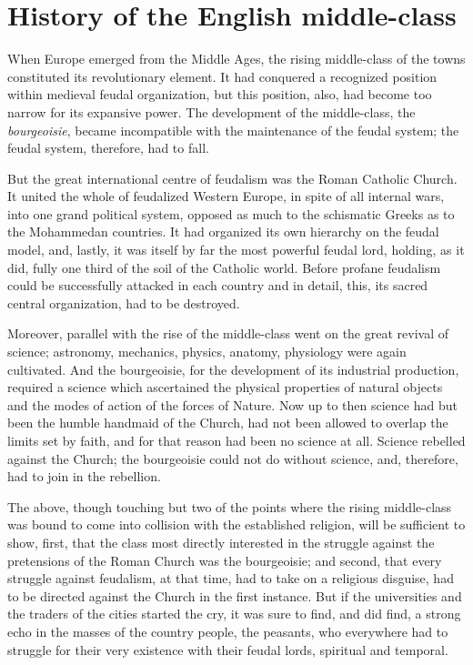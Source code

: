 \section*{History of the English middle-class}

When Europe emerged from the Middle Ages, the rising middle-class of the towns
constituted its revolutionary element. It had conquered a recognized position
within medieval feudal organization, but this position, also, had become too
narrow for its expansive power. The development of the middle-class, the
\emph{bourgeoisie}, became incompatible with the maintenance of the feudal
system; the feudal system, therefore, had to fall.

But the great international centre of feudalism was the Roman Catholic Church.
It united the whole of feudalized Western Europe, in spite of all internal wars,
into one grand political system, opposed as much to the schismatic Greeks as to
the Mohammedan countries. It had organized its own hierarchy on the feudal
model, and, lastly, it was itself by far the most powerful feudal lord, holding,
as it did, fully one third of the soil of the Catholic world. Before profane
feudalism could be successfully attacked in each country and in detail, this,
its sacred central organization, had to be destroyed.

Moreover, parallel with the rise of the middle-class went on the great revival
of science; astronomy, mechanics, physics, anatomy, physiology were again
cultivated. And the bourgeoisie, for the development of its industrial
production, required a science which ascertained the physical properties of
natural objects and the modes of action of the forces of Nature. Now up to then
science had but been the humble handmaid of the Church, had not been allowed to
overlap the limits set by faith, and for that reason had been no science at all.
Science rebelled against the Church; the bourgeoisie could not do without
science, and, therefore, had to join in the rebellion.

The above, though touching but two of the points where the rising middle-class
was bound to come into collision with the established religion, will be
sufficient to show, first, that the class most directly interested in the
struggle against the pretensions of the Roman Church was the bourgeoisie; and
second, that every struggle against feudalism, at that time, had to take on a
religious disguise, had to be directed against the Church in the first instance.
But if the universities and the traders of the cities started the cry, it was
sure to find, and did find, a strong echo in the masses of the country people,
the peasants, who everywhere had to struggle for their very existence with their
feudal lords, spiritual and temporal.

